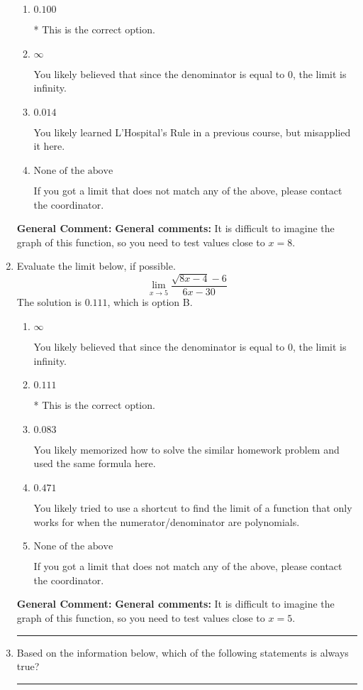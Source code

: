 \documentclass{extbook}[14pt]
\newcommand{\litem}[1]{\item #1

\rule{\textwidth}{0.4pt}}
\begin{document}
\begin{enumerate}
{\begin{enumerate}[label=\Alph*.]
You likely memorized how to solve the similar homework problem and used the same formula here.
\item \( 0.100 \)

* This is the correct option.
\item \( \infty \)

You likely believed that since the denominator is equal to 0, the limit is infinity.
\item \( 0.014 \)

You likely learned L'Hospital's Rule in a previous course, but misapplied it here.
\item \( \text{None of the above} \)

If you got a limit that does not match any of the above, please contact the coordinator.
\end{enumerate}

\textbf{General Comment:} \textbf{General comments:} It is difficult to imagine the graph of this function, so you need to test values close to $x = 8$.
}
\litem{
Evaluate the limit below, if possible.
\[ \lim_{x \rightarrow 5} \frac{\sqrt{8x - 4} - 6}{6x - 30} \]The solution is \( 0.111 \), which is option B.\begin{enumerate}[label=\Alph*.]
\item \( \infty \)

You likely believed that since the denominator is equal to 0, the limit is infinity.
\item \( 0.111 \)

* This is the correct option.
\item \( 0.083 \)

You likely memorized how to solve the similar homework problem and used the same formula here.
\item \( 0.471 \)

You likely tried to use a shortcut to find the limit of a function that only works for when the numerator/denominator are polynomials.
\item \( \text{None of the above} \)

If you got a limit that does not match any of the above, please contact the coordinator.
\end{enumerate}

\textbf{General Comment:} \textbf{General comments:} It is difficult to imagine the graph of this function, so you need to test values close to $x = 5$.
}
\litem{
Based on the information below, which of the following statements is always true?

}
\end{enumerate}
\end{document}
